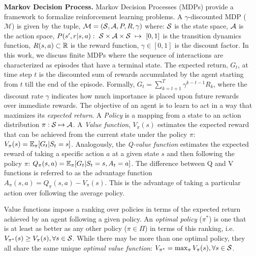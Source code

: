 \textbf{Markov Decision Process.}
Markov Decision Processes (MDPs) provide a framework to formalize reinforcement learning problems.
A $\gamma$-discounted MDP ($\mathcal{M}$) is given by the tuple, $\mathcal{M}=(\mathcal{S}, \mathcal{A}, P, R,
	\gamma)$ where: $\mathcal{S}$ is the state space, $\mathcal{A}$ is the action space,
$P(s',r|s,a):~\mathcal{S}\times\mathcal{A}\times\mathcal{S}~\mapsto~[0,1]$ is the transition dynamics function,
$R(s,a) \subset \mathbb{R}$ is the reward function, $\gamma \in [0,1]$ is the discount factor.
In this work, we discuss finite MDPs where the sequence of interactions are characterized as
episodes that have a terminal state.
The expected return, $G_t$, at time step $t$ is the discounted sum of rewards accumulated by the
agent starting from $t$ till the end of the episode.
Formally, $G_t = \sum_{k=t+1}^{T} \gamma^{k-t-1} R_k$, where the discount rate $\gamma$ indicates
how much importance is placed upon future rewards over immediate rewards.
The objective of an agent is to learn to act in a way that maximizes its \textit{expected return}.
A \textit{Policy} is a mapping from a state to an action distribution $\pi: \mathcal{S} \mapsto \mathcal{A}$.
A \textit{Value function}, $V_{\pi}(s)$ estimates the expected reward that can be achieved from the
current state under the policy $\pi$: $V_{\pi}(s) = \mathbb{E}_{\pi}[G_t | S_t = s]$.
Analogously, the \textit{Q-value function} estimates the expected reward of taking a specific
action $a$ at a given state $s$ and then following the policy $\pi$: $ Q_{\pi}(s, a) = \mathbb{E}_{\pi}[G_t
		| S_t = s, A_t = a] $.
The difference between Q and V functions is referred to as the advantage function $A_\pi(s,a) =
	Q_\pi(s,a) - V_\pi(s)$.
This is the advantage of taking a particular action over following the average policy.

Value functions impose a ranking over policies in terms of the expected return achieved by an agent
following a given policy.
An \textit{optimal policy} ($\pi^\ast$) is one that is at least as better as any other policy ($\pi
	\in \Pi$) in terms of this ranking, i.e. $V_{\pi^\ast}(s) \geq V_\pi(s), \forall s \in \mathcal{S}$.
While there may be more than one optimal policy, they all share the same unique \textit{optimal
	value function}: $V_{\pi^{\ast}} = \max_{\pi} V_\pi(s), \forall s \in \mathcal{S}$.


